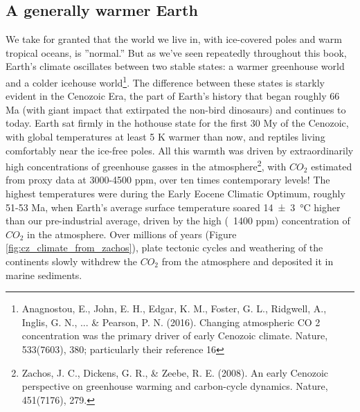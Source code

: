 \subsection{A generally warmer Earth}
We take for granted that the world we live in, with ice-covered poles and warm tropical oceans, is ''normal.'' But as we've seen repeatedly throughout this book, Earth's climate oscillates between two stable states: a warmer greenhouse world and a colder icehouse world\footnote{Anagnostou, E., John, E. H., Edgar, K. M., Foster, G. L., Ridgwell, A., Inglis, G. N., ... \& Pearson, P. N. (2016). Changing atmospheric CO 2 concentration was the primary driver of early Cenozoic climate. Nature, 533(7603), 380; particularly their reference 16}. The difference between these states is starkly evident in the Cenozoic Era, the part of Earth's history that began roughly 66 Ma (with giant impact that extirpated the non-bird dinosaurs) and continues to today. Earth sat firmly in the hothouse state for the first 30 My of the Cenozoic, with global temperatures at least 5 K warmer than now, and reptiles living comfortably near the ice-free poles. All this warmth was driven by extraordinarily high concentrations of greenhouse gasses in the atmosphere\footnote{Zachos, J. C., Dickens, G. R., \& Zeebe, R. E. (2008). An early Cenozoic perspective on greenhouse warming and carbon-cycle dynamics. Nature, 451(7176), 279.}, with $CO_2$ estimated from proxy data at 3000-4500 ppm, over ten times contemporary levels! The highest temperatures were during the Early Eocene Climatic Optimum, roughly 51-53 Ma, when Earth's average surface temperature soared \SI{14(3)}{\celsius} higher than our pre-industrial average, driven by the high (~1400 ppm) concentration of $CO_2$ in the atmosphere. Over millions of years (Figure \ref{fig:cz_climate_from_zachos}), plate tectonic cycles and weathering of the continents slowly withdrew the $CO_2$ from the atmosphere and deposited it in marine sediments. \\ 
